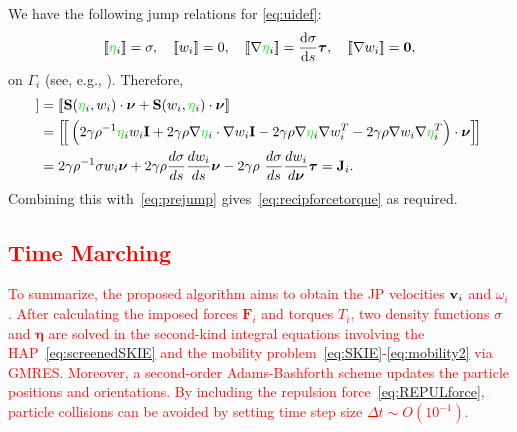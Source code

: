 \documentclass[lineno]{jfm}
\newcommand{\eeta}{\boldsymbol{\eta}}
\newcommand{\FF}{\mathbf{F}}
\newcommand{\JJ}{\mathbf{J}}
\newcommand{\nnu}{\boldsymbol{\nu}}
\newcommand{\ttau}{\boldsymbol{\tau}}
\renewcommand{\SS}{\mathbf{S}}
\newcommand{\jump}[1]{[\![ #1 ]\!]}
\newcommand{\ReviewerOne}[1]{\textcolor{red}{#1}}
\newcommand{\ReviewerTwo}[1]{\textcolor{green}{#1}}
\begin{document}
We have the following jump relations for \eqref{eq:uidef}: 
\begin{equation}
\label{eq:DLjump}
\jump{\ReviewerTwo{\eta}_i} = \sigma, \quad
\jump{w_i} = 0, \quad
\jump{\nabla \ReviewerTwo{\eta}_i} = \frac{\dif \sigma}{\dif s}\ttau,\quad
\jump{\nabla w_i} = \mathbf{0},
\end{equation}
on $\Gamma_i$ (see, e.g., \cite{KlBaGrON13}). Therefore,
\begin{align*}
  \jump{{\bf T}_2 \cdot \nnu}   &= \jump{\SS(\ReviewerTwo{\eta}_i,w_i) \cdot \nnu +
    \SS(w_i,\ReviewerTwo{\eta}_i) \cdot \nnu} \\
  &= \Big[\!\Big[ \left( 2\gamma\rho^{-1} \ReviewerTwo{\eta}_i w_i \mathbf{I} + 2\gamma\rho \nabla \ReviewerTwo{\eta}_i \cdot \nabla w_i \mathbf{I} 
- 2\gamma\rho \nabla \ReviewerTwo{\eta}_i  \nabla w_i^T - 2\gamma\rho \nabla w_i \nabla
  \ReviewerTwo{\eta}_i^T\right) \cdot \nnu \Big]\!\Big] \\
&= 2\gamma\rho^{-1} \sigma w_i \nnu + 2\gamma\rho \frac{d\sigma }{ds}\frac{dw_i }{ds} \nnu
- 2\gamma\rho \ \frac{d\sigma }{ds} \frac{dw_i }{d\nnu} \ttau = \JJ_i.
\end{align*}
Combining this with~\eqref{eq:prejump} gives~\eqref{eq:recipforcetorque}
as required. 


\ReviewerOne{
\subsection{Time Marching}
To summarize, the proposed algorithm aims to obtain the JP velocities ${\bf v}_i$ and $\omega_i$. 
After calculating the imposed forces $\FF_i$ and torques $T_i$, 
two density functions $\sigma$ and  $\eeta$ are solved in the second-kind integral equations involving the HAP~\eqref{eq:screenedSKIE} and the mobility problem~\eqref{eq:SKIE}-\eqref{eq:mobility2} via GMRES.
Moreover, a second-order Adams-Bashforth
scheme updates the particle positions and orientations. By including the
repulsion force~\eqref{eq:REPULforce}, particle collisions can be avoided by setting time step
size $\Delta t\sim O(10^{-1})$.
}
\end{document}
